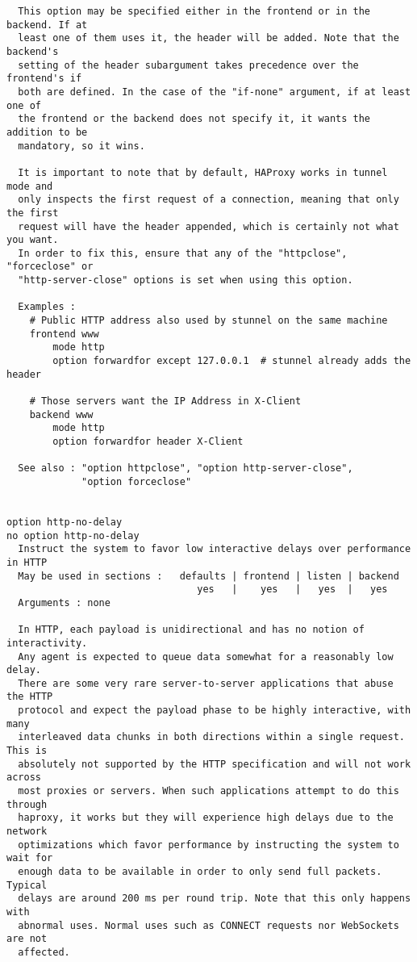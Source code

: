 \begin{verbatim}
  This option may be specified either in the frontend or in the backend. If at
  least one of them uses it, the header will be added. Note that the backend's
  setting of the header subargument takes precedence over the frontend's if
  both are defined. In the case of the "if-none" argument, if at least one of
  the frontend or the backend does not specify it, it wants the addition to be
  mandatory, so it wins.

  It is important to note that by default, HAProxy works in tunnel mode and
  only inspects the first request of a connection, meaning that only the first
  request will have the header appended, which is certainly not what you want.
  In order to fix this, ensure that any of the "httpclose", "forceclose" or
  "http-server-close" options is set when using this option.

  Examples :
    # Public HTTP address also used by stunnel on the same machine
    frontend www
        mode http
        option forwardfor except 127.0.0.1  # stunnel already adds the header

    # Those servers want the IP Address in X-Client
    backend www
        mode http
        option forwardfor header X-Client

  See also : "option httpclose", "option http-server-close",
             "option forceclose"


option http-no-delay
no option http-no-delay
  Instruct the system to favor low interactive delays over performance in HTTP
  May be used in sections :   defaults | frontend | listen | backend
                                 yes   |    yes   |   yes  |   yes
  Arguments : none

  In HTTP, each payload is unidirectional and has no notion of interactivity.
  Any agent is expected to queue data somewhat for a reasonably low delay.
  There are some very rare server-to-server applications that abuse the HTTP
  protocol and expect the payload phase to be highly interactive, with many
  interleaved data chunks in both directions within a single request. This is
  absolutely not supported by the HTTP specification and will not work across
  most proxies or servers. When such applications attempt to do this through
  haproxy, it works but they will experience high delays due to the network
  optimizations which favor performance by instructing the system to wait for
  enough data to be available in order to only send full packets. Typical
  delays are around 200 ms per round trip. Note that this only happens with
  abnormal uses. Normal uses such as CONNECT requests nor WebSockets are not
  affected.


\end{verbatim}
